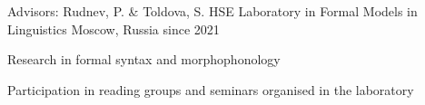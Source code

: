 

\begin{cventries}

  \cventry
    {Advisors: Rudnev, P. \& Toldova, S.} %
    {HSE Laboratory in Formal Models in Linguistics} %
    {Moscow, Russia} %
    {since 2021} %
    {
      \begin{cvitems} %
        \item {Research in formal syntax and morphophonology}
        \item {Participation in reading groups and seminars organised in the laboratory}
      \end{cvitems}
    }

    
\end{cventries}

\newpage
    


